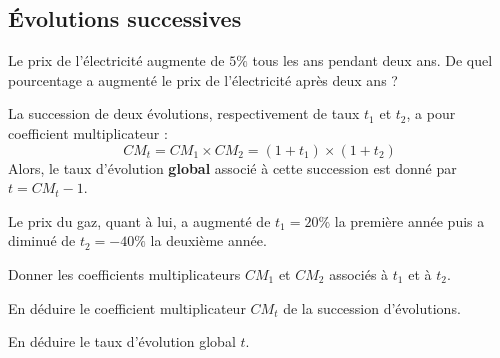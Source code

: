 \documentclass{poly}
\begin{document}
\subsection{Évolutions successives}
\begin{example}
Le prix de l'électricité augmente de $5\%$ tous les ans pendant deux ans. De quel pourcentage a augmenté le prix de l'électricité après deux ans ?
\end{example}
\begin{center}
\end{center}
\begin{proposition}
La succession de deux évolutions, respectivement de taux $t_1$ et $t_2$, a pour coefficient multiplicateur :
\begin{equation*}
CM_t = CM_1 \times CM_2 = (1 + t_1) \times (1 + t_2)
\end{equation*}
Alors, le taux d'évolution \textbf{global} associé à cette succession est donné par $t = CM_t - 1$.
\end{proposition}
\begin{example}
Le prix du gaz, quant à lui, a augmenté de $t_1 = 20\%$ la première année puis a diminué de $t_2 = -40\%$ la deuxième année.
\begin{alphaquestions}
\item Donner les coefficients multiplicateurs $CM_1$ et $CM_2$ associés à $t_1$ et à $t_2$.
\item En déduire le coefficient multiplicateur $CM_t$ de la succession d'évolutions.
\item En déduire le taux d'évolution global $t$.    
\end{alphaquestions}
\vspace*{0.5cm}

\end{example}
\newpage
\end{document}
